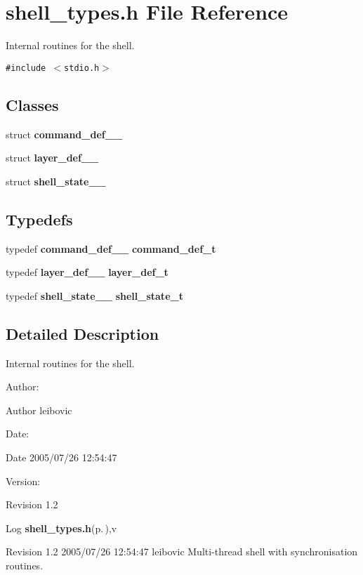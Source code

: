 \section{shell\_\-types.h File Reference}
\label{shell__types_8h}
Internal routines for the shell. 

{\tt \#include $<$stdio.h$>$}\par
\subsection*{Classes}
\begin{CompactItemize}
\item 
struct {\bf command\_\-def\_\-\_\-}
\item 
struct {\bf layer\_\-def\_\-\_\-}
\item 
struct {\bf shell\_\-state\_\-\_\-}
\end{CompactItemize}
\subsection*{Typedefs}
\begin{CompactItemize}
\item 
typedef {\bf command\_\-def\_\-\_\-} {\bf command\_\-def\_\-t}
\item 
typedef {\bf layer\_\-def\_\-\_\-} {\bf layer\_\-def\_\-t}
\item 
typedef {\bf shell\_\-state\_\-\_\-} {\bf shell\_\-state\_\-t}
\end{CompactItemize}


\subsection{Detailed Description}
Internal routines for the shell. 

\begin{Desc}
\item[Author:]\begin{Desc}
\item[Author]leibovic \end{Desc}
\end{Desc}
\begin{Desc}
\item[Date:]\begin{Desc}
\item[Date]2005/07/26 12:54:47 \end{Desc}
\end{Desc}
\begin{Desc}
\item[Version:]\begin{Desc}
\item[Revision]1.2 \end{Desc}
\end{Desc}
\begin{Desc}
\item[Log]{\bf shell\_\-types.h}{\rm (p.\,\pageref{shell__types_8h})},v \end{Desc}
Revision 1.2 2005/07/26 12:54:47 leibovic Multi-thread shell with synchronisation routines.

